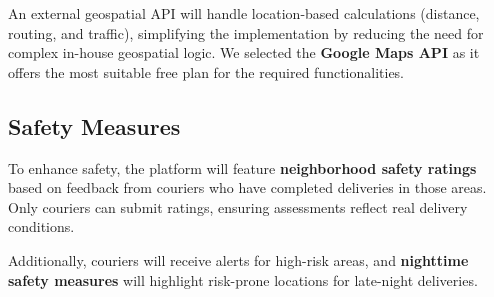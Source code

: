 An external geospatial API will handle location-based calculations (distance, routing, and traffic), simplifying the implementation by reducing the need for complex in-house geospatial logic. We selected the \textbf{Google Maps API} as it offers the most suitable free plan for the required functionalities.

\subsection{Safety Measures}  

To enhance safety, the platform will feature \textbf{neighborhood safety ratings} based on feedback from couriers who have completed deliveries in those areas. Only couriers can submit ratings, ensuring assessments reflect real delivery conditions.  

Additionally, couriers will receive alerts for high-risk areas, and \textbf{nighttime safety measures} will highlight risk-prone locations for late-night deliveries.